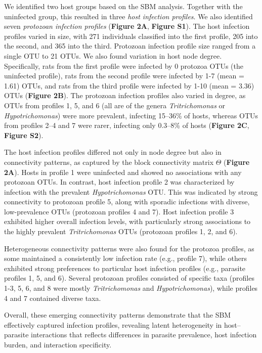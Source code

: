\documentclass[oneside, a4paper, onecolumn, 11pt]{article}
\begin{document}
We identified two host groups based on the SBM analysis. Together with the uninfected group, this resulted in three \textit{host infection profiles}. We also identified seven \textit{protozoan infection profiles} (\textbf{Figure 2A}, \textbf{Figure S1}). The host infection profiles varied in size, with 271 individuals classified into the first profile, 205 into the second, and 365 into the third. Protozoan infection profile size ranged from a single OTU to 21 OTUs. We also found variation in host node degree. Specifically, rats from the first profile were infected by 0 protozoa OTUs (the uninfected profile), rats from the second profile were infected by 1-7 (mean = 1.61) OTUs, and rats from the third profile were infected by 1-10 (mean = 3.36) OTUs (\textbf{Figure 2B}). The protozoan infection profiles also varied in degree, as OTUs from profiles 1, 5, and 6 (all are of the genera \textit{Tritrichomonas} or \textit{Hypotrichomonas}) were more prevalent, infecting 15–36\% of hosts, whereas OTUs from profiles 2–4 and 7 were rarer, infecting only 0.3–8\% of hosts (\textbf{Figure 2C}, \textbf{Figure S2}). 

The host infection profiles differed not only in node degree but also in connectivity patterns, as captured by the block connectivity matrix $\Theta$ (\textbf{Figure 2A}). Hosts in profile 1 were uninfected and showed no associations with any protozoan OTUs. In contrast, host infection profile 2 was characterized by infection with the prevalent \textit{Hypotrichomonas} OTU. This was indicated by strong connectivity to protozoan profile 5, along with sporadic infections with diverse, low-prevalence OTUs (protozoan profiles 4 and 7). Host infection profile 3 exhibited higher overall infection levels, with particularly strong associations to the highly prevalent \textit{Tritrichomonas} OTUs (protozoan profiles 1, 2, and 6). 

Heterogeneous connectivity patterns were also found for the protozoa profiles, as some maintained a consistently low infection rate (e.g., profile 7), while others exhibited strong preferences to particular host infection profiles (e.g., parasite profiles 1, 5, and 6). Several protozoan profiles consisted of specific taxa (profiles 1-3, 5, 6, and 8 were mostly \textit{Tritrichomonas} and \textit{Hypotrichomonas}), while profiles 4 and 7 contained diverse taxa. 

Overall, these emerging connectivity patterns demonstrate that the SBM effectively captured infection profiles, revealing latent heterogeneity in host–parasite interactions that reflects differences in parasite prevalence, host infection burden, and interaction specificity.
\end{document}
